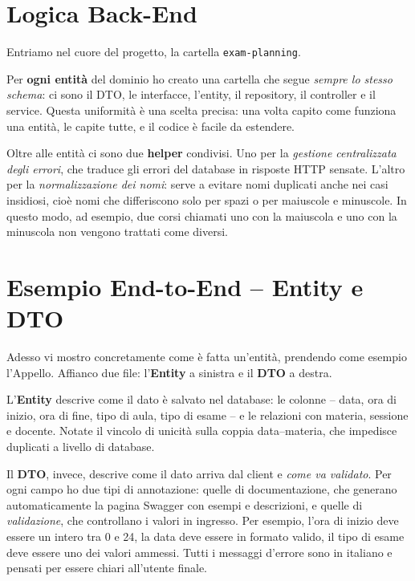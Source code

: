 \documentclass[11pt]{article}
\begin{document}
\section*{Logica Back-End}

Entriamo nel cuore del progetto, la cartella \texttt{exam-planning}.

Per \textbf{ogni entità} del dominio ho creato una cartella che segue \emph{sempre lo
stesso schema}: ci sono il DTO, le interfacce, l'entity, il repository, il controller e
il service. Questa uniformità è una scelta precisa: una volta capito come funziona una
entità, le capite tutte, e il codice è facile da estendere.

Oltre alle entità ci sono due \textbf{helper} condivisi. Uno per la \emph{gestione
centralizzata degli errori}, che traduce gli errori del database in risposte HTTP
sensate. L'altro per la \emph{normalizzazione dei nomi}: serve a evitare nomi duplicati
anche nei casi insidiosi, cioè nomi che differiscono solo per spazi o per maiuscole e
minuscole. In questo modo, ad esempio, due corsi chiamati uno con la maiuscola e uno con
la minuscola non vengono trattati come diversi.

\section*{Esempio End-to-End -- Entity e DTO}

Adesso vi mostro concretamente come è fatta un'entità, prendendo come esempio l'Appello.
Affianco due file: l'\textbf{Entity} a sinistra e il \textbf{DTO} a destra.

L'\textbf{Entity} descrive come il dato è salvato nel database: le colonne -- data, ora
di inizio, ora di fine, tipo di aula, tipo di esame -- e le relazioni con materia,
sessione e docente. Notate il vincolo di unicità sulla coppia data--materia, che impedisce
duplicati a livello di database.

Il \textbf{DTO}, invece, descrive come il dato arriva dal client e \emph{come va
validato}. Per ogni campo ho due tipi di annotazione: quelle di documentazione, che
generano automaticamente la pagina Swagger con esempi e descrizioni, e quelle di
\emph{validazione}, che controllano i valori in ingresso. Per esempio, l'ora di inizio
deve essere un intero tra 0 e 24, la data deve essere in formato valido, il tipo di
esame deve essere uno dei valori ammessi. Tutti i messaggi d'errore sono in italiano e
pensati per essere chiari all'utente finale.
\end{document}
